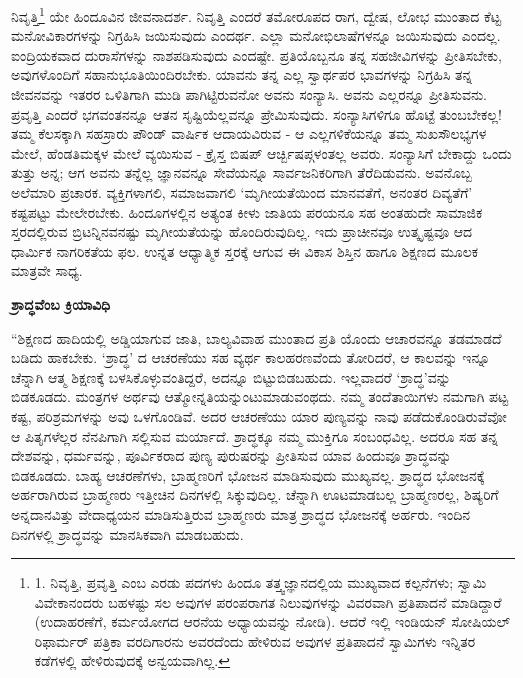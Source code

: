 ನಿವೃತ್ತಿ\footnote{1. ನಿವೃತ್ತಿ, ಪ್ರವೃತ್ತಿ ಎಂಬ ಎರಡು ಪದಗಳು ಹಿಂದೂ ತತ್ತ್ವಜ್ಞಾನದಲ್ಲಿಯ ಮುಖ್ಯವಾದ ಕಲ್ಪನೆಗಳು; ಸ್ವಾಮಿ ವಿವೇಕಾನಂದರು ಬಹಳಷ್ಟು ಸಲ ಅವುಗಳ ಪರಂಪರಾಗತ ನಿಲುವುಗಳನ್ನು ವಿವರವಾಗಿ ಪ್ರತಿಪಾದನೆ ಮಾಡಿದ್ದಾರೆ (ಉದಾಹರಣೆಗೆ, ಕರ್ಮಯೋಗದ ಆರನೆಯ ಅಧ್ಯಾಯವನ್ನು ನೋಡಿ). ಆದರೆ ಇಲ್ಲಿ ಇಂಡಿಯನ್ ಸೋಷಿಯಲ್ ರಿಫಾರ್ಮರ್ ಪತ್ರಿಕಾ ವರದಿಗಾರನು ಅವರದೆಂದು ಹೇಳಿರುವ ಅವುಗಳ ಪ್ರತಿಪಾದನೆ ಸ್ವಾಮಿಗಳು ಇನ್ನಿತರ ಕಡೆಗಳಲ್ಲಿ ಹೇಳಿರುವುದಕ್ಕೆ ಅನ್ವಯವಾಗಿಲ್ಲ.} ಯೇ ಹಿಂದೂವಿನ ಜೀವನಾದರ್ಶ. ನಿವೃತ್ತಿ ಎಂದರೆ ತಮೋರೂಪದ ರಾಗ, ದ್ವೇಷ, ಲೋಭ ಮುಂತಾದ ಕೆಟ್ಟ ಮನೋವಿಕಾರಗಳನ್ನು ನಿಗ್ರಹಿಸಿ ಜಯಿಸುವುದು ಎಂದರ್ಥ. ಎಲ್ಲಾ ಮನೋಭಿಲಾಷೆಗಳನ್ನೂ ಜಯಿಸುವುದು ಎಂದಲ್ಲ. ಐಂದ್ರಿಯಕವಾದ ದುರಾಸೆಗಳನ್ನು ನಾಶಪಡಿಸುವುದು ಎಂದಷ್ಟೇ. ಪ್ರತಿಯೊಬ್ಬನೂ ತನ್ನ ಸಹಜೀವಿಗಳನ್ನು ಪ್ರೀತಿಸಬೇಕು, ಅವುಗಳೊಂದಿಗೆ ಸಹಾನುಭೂತಿಯಿಂದಿರಬೇಕು. ಯಾವನು ತನ್ನ ಎಲ್ಲ ಸ್ವಾರ್ಥಪರ ಭಾವಗಳನ್ನು ನಿಗ್ರಹಿಸಿ ತನ್ನ ಜೀವನವನ್ನು ಇತರರ ಒಳಿತಿಗಾಗಿ ಮುಡಿ ಪಾಗಿಟ್ಟಿರುವನೋ ಅವನು ಸಂನ್ಯಾಸಿ. ಅವನು ಎಲ್ಲರನ್ನೂ ಪ್ರೀತಿಸುವನು. ಪ್ರವೃತ್ತಿ ಎಂದರೆ ಭಗವಂತನನ್ನೂ ಆತನ ಸೃಷ್ಟಿಯೆಲ್ಲವನ್ನೂ ಪ್ರೇಮಿಸುವುದು. ಸಂನ್ಯಾಸಿಗಳಿಗೂ ಹೊಟ್ಟೆ ತುಂಬಬೇಕಲ್ಲ! ತಮ್ಮ ಕೆಲಸಕ್ಕಾಗಿ ಸಹಸ್ರಾರು ಪೌಂಡ್ ವಾರ್ಷಿಕ ಆದಾಯವಿರುವ - ಆ ಎಲ್ಲಗಳಿಕೆಯನ್ನೂ ತಮ್ಮ ಸುಖಸೌಲಭ್ಯಗಳ ಮೇಲೆ, ಹೆಂಡತಿಮಕ್ಕಳ ಮೇಲೆ ವ್ಯಯಿಸುವ - ಕ್ರೈಸ್ತ ಬಿಷಪ್ ಆರ್ಚ್ಬಿಷಪ್ಗಳಂತಲ್ಲ ಅವರು. ಸಂನ್ಯಾಸಿಗೆ ಬೇಕಾದ್ದು ಒಂದು ತುತ್ತು ಅನ್ನ; ಆಗ ಅವನು ತನ್ನೆಲ್ಲ ಜ್ಞಾನವನ್ನೂ ಸೇವೆಯನ್ನೂ ಸಾರ್ವಜನಿಕರಿಗಾಗಿ ತೆರೆದಿಡುವನು. ಅವನೊಬ್ಬ ಅಲೆಮಾರಿ ಪ್ರಚಾರಕ. ವ್ಯಕ್ತಿಗಳಾಗಲಿ, ಸಮಾಜವಾಗಲಿ ‘ಮೃಗೀಯತೆಯಿಂದ ಮಾನವತೆಗೆ, ಅನಂತರ ದಿವ್ಯತೆಗೆ’ ಕಷ್ಟಪಟ್ಟು ಮೇಲೇರಬೇಕು. ಹಿಂದೂಗಳಲ್ಲಿನ ಅತ್ಯಂತ ಕೀಳು ಜಾತಿಯ ಪರಯನೂ ಸಹ ಅಂತಹುದೇ ಸಾಮಾಜಿಕ ಸ್ತರದಲ್ಲಿರುವ ಬ್ರಿಟನ್ನಿನವನಷ್ಟು ಮೃಗೀಯತೆಯನ್ನು ಹೊಂದಿರುವುದಿಲ್ಲ. ಇದು ಪ್ರಾಚೀನವೂ ಉತ್ಕೃಷ್ಟವೂ ಆದ ಧಾರ್ಮಿಕ ನಾಗರಿಕತೆಯ ಫಲ. ಉನ್ನತ ಆಧ್ಯಾತ್ಮಿಕ ಸ್ತರಕ್ಕೆ ಆಗುವ ಈ ವಿಕಾಸ ಶಿಸ್ತಿನ ಹಾಗೂ ಶಿಕ್ಷಣದ ಮೂಲಕ ಮಾತ್ರವೇ ಸಾಧ್ಯ.

\begin{center}
\textbf{ಶ್ರಾದ್ಧವೆಂಬ ಕ್ರಿಯಾವಿಧಿ}
\end{center}

“ಶಿಕ್ಷಣದ ಹಾದಿಯಲ್ಲಿ ಅಡ್ಡಿಯಾಗುವ ಜಾತಿ, ಬಾಲ್ಯವಿವಾಹ ಮುಂತಾದ ಪ್ರತಿ ಯೊಂದು ಆಚಾರವನ್ನೂ ತಡಮಾಡದೆ ಬಡಿದು ಹಾಕಬೇಕು. ‘ಶ್ರಾದ್ಧ’ ದ ಆಚರಣೆಯು ಸಹ ವ್ಯರ್ಥ ಕಾಲಹರಣವೆಂದು ತೋರಿದರೆ, ಆ ಕಾಲವನ್ನು ಇನ್ನೂ ಚೆನ್ನಾಗಿ ಆತ್ಮ ಶಿಕ್ಷಣಕ್ಕೆ ಬಳಸಿಕೊಳ್ಳುವಂತಿದ್ದರೆ, ಅದನ್ನೂ ಬಿಟ್ಟುಬಿಡಬಹುದು. ಇಲ್ಲವಾದರೆ ‘ಶ್ರಾದ್ಧ’ವನ್ನು ಬಿಡಕೂಡದು. ಮಂತ್ರಗಳ ಅರ್ಥವು ಆತ್ಮೋನ್ನತಿಯನ್ನುಂಟುಮಾಡುವಂಥದು. ನಮ್ಮ ತಂದೆತಾಯಿಗಳು ನಮಗಾಗಿ ಪಟ್ಟ ಕಷ್ಟ, ಪರಿಶ್ರಮಗಳನ್ನು ಅವು ಒಳಗೊಂಡಿವೆ. ಅದರ ಆಚರಣೆಯು ಯಾರ ಪುಣ್ಯವನ್ನು ನಾವು ಪಡೆದುಕೊಂಡಿರುವೆವೋ ಆ ಪಿತೃಗಳೆಲ್ಲರ ನೆನಪಿಗಾಗಿ ಸಲ್ಲಿಸುವ ಮರ್ಯಾದೆ. ಶ್ರಾದ್ಧಕ್ಕೂ ನಮ್ಮ ಮುಕ್ತಿಗೂ ಸಂಬಂಧವಿಲ್ಲ. ಅದರೂ ಸಹ ತನ್ನ ದೇಶವನ್ನು, ಧರ್ಮವನ್ನು, ಪೂರ್ವಿಕರಾದ ಪುಣ್ಯ ಪುರುಷರನ್ನು ಪ್ರೀತಿಸುವ ಯಾವ ಹಿಂದುವೂ ಶ್ರಾದ್ಧವನ್ನು ಬಿಡಕೂಡದು. ಬಾಹ್ಯ ಆಚರಣೆಗಳು, ಬ್ರಾಹ್ಮಣರಿಗೆ ಭೋಜನ ಮಾಡಿಸುವುದು ಮುಖ್ಯವಲ್ಲ. ಶ್ರಾದ್ಧದ ಭೋಜನಕ್ಕೆ ಅರ್ಹರಾಗಿರುವ ಬ್ರಾಹ್ಮಣರು ಇತ್ತೀಚಿನ ದಿನಗಳಲ್ಲಿ ಸಿಕ್ಕುವುದಿಲ್ಲ. ಚೆನ್ನಾಗಿ ಊಟಮಾಡಬಲ್ಲ ಬ್ರಾಹ್ಮಣರಲ್ಲ, ಶಿಷ್ಯರಿಗೆ ಅನ್ನದಾನವಿತ್ತು ವೇದಾಧ್ಯಯನ ಮಾಡಿಸುತ್ತಿರುವ ಬ್ರಾಹ್ಮಣರು ಮಾತ್ರ ಶ್ರಾದ್ಧದ ಭೋಜನಕ್ಕೆ ಅರ್ಹರು. ಇಂದಿನ ದಿನಗಳಲ್ಲಿ ಶ್ರಾದ್ಧವನ್ನು ಮಾನಸಿಕವಾಗಿ ಮಾಡಬಹುದು.

